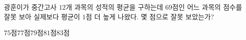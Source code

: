 광훈이가 중간고사 $12$개 과목의 성적의 평균을 구하는데 $69$점인 어느 과목의 점수를 잘못 보아 실제보다 평균이 $1$점 더 높게 나왔다. 몇 점으로 잘못 보았는가?
\begin{choices32}{$75$점}{$77$점}{$79$점}{$81$점}{$83$점}\end{choices32}
